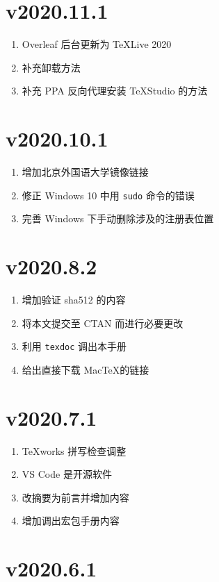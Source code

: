 \section*{v2020.11.1}

\begin{enumerate}
  \item Overleaf 后台更新为 \TeX Live 2020
  \item 补充卸载方法
  \item 补充 PPA 反向代理安装 \TeX Studio 的方法
\end{enumerate}

\section*{v2020.10.1}

\begin{enumerate}
  \item 增加北京外国语大学镜像链接
  \item 修正 Windows 10 中用 \texttt{sudo} 命令的错误
  \item 完善 Windows 下手动删除涉及的注册表位置
\end{enumerate}

\section*{v2020.8.2}

\begin{enumerate}
  \item 增加验证 sha512 的内容
  \item 将本文提交至 CTAN 而进行必要更改
  \item 利用 \texttt{texdoc} 调出本手册
  \item 给出直接下载 Mac\TeX 的链接
\end{enumerate}

\section*{v2020.7.1}

\begin{enumerate}
  \item \TeX works 拼写检查调整
  \item VS Code 是开源软件
  \item 改摘要为前言并增加内容
  \item 增加调出宏包手册内容
\end{enumerate}

\section*{v2020.6.1}

